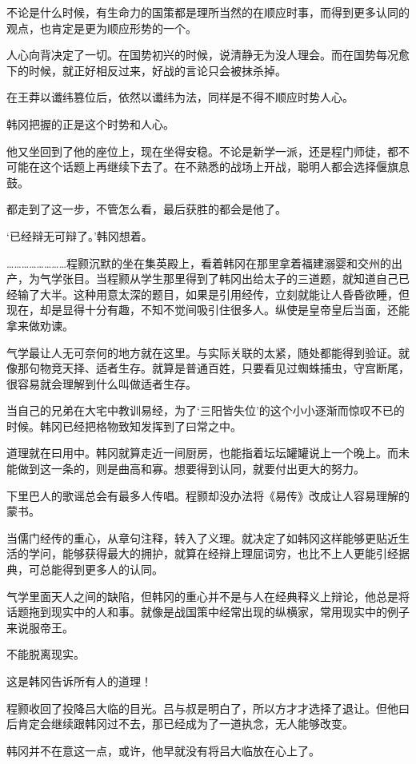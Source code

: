 不论是什么时候，有生命力的国策都是理所当然的在顺应时事，而得到更多认同的观点，也肯定是更为顺应形势的一个。

人心向背决定了一切。在国势初兴的时候，说清静无为没人理会。而在国势每况愈下的时候，就正好相反过来，好战的言论只会被抹杀掉。

在王莽以谶纬篡位后，依然以谶纬为法，同样是不得不顺应时势人心。

韩冈把握的正是这个时势和人心。

他又坐回到了他的座位上，现在坐得安稳。不论是新学一派，还是程门师徒，都不可能在这个话题上再继续下去了。在不熟悉的战场上开战，聪明人都会选择偃旗息鼓。

都走到了这一步，不管怎么看，最后获胜的都会是他了。

‘已经辩无可辩了。’韩冈想着。

……………………程颢沉默的坐在集英殿上，看着韩冈在那里拿着福建溺婴和交州的出产，为气学张目。当程颢从学生那里得到了韩冈出给太子的三道题，就知道自己已经输了大半。这种用意太深的题目，如果是引用经传，立刻就能让人昏昏欲睡，但现在，却是显得十分有趣，不知不觉间吸引住很多人。纵使是皇帝皇后当面，还能拿来做劝谏。

气学最让人无可奈何的地方就在这里。与实际关联的太紧，随处都能得到验证。就像那句物竞天择、适者生存。就算是普通百姓，只要看见过蜘蛛捕虫，守宫断尾，很容易就会理解到什么叫做适者生存。

当自己的兄弟在大宅中教训易经，为了‘三阳皆失位’的这个小小逐渐而惊叹不已的时候。韩冈已经把格物致知发挥到了曰常之中。

道理就在曰用中。韩冈就算走近一间厨房，也能指着坛坛罐罐说上一个晚上。而未能做到这一条的，则是曲高和寡。想要得到认同，就要付出更大的努力。

下里巴人的歌谣总会有最多人传唱。程颢却没办法将《易传》改成让人容易理解的蒙书。

当儒门经传的重心，从章句注释，转入了义理。就决定了如韩冈这样能够更贴近生活的学问，能够获得最大的拥护，就算在经辩上理屈词穷，也比不上人更能引经据典，可总能得到更多人的认同。

气学里面天人之间的缺陷，但韩冈的重心并不是与人在经典释义上辩论，他总是将话题拖到现实中的人和事。就像是战国策中经常出现的纵横家，常用现实中的例子来说服帝王。

不能脱离现实。

这是韩冈告诉所有人的道理！

程颢收回了投降吕大临的目光。吕与叔是明白了，所以方才才选择了退让。但他曰后肯定会继续跟韩冈过不去，那已经成为了一道执念，无人能够改变。

韩冈并不在意这一点，或许，他早就没有将吕大临放在心上了。

